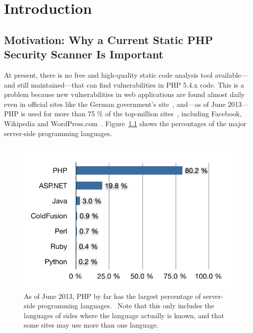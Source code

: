 \chapter{Introduction}

\section{Motivation: Why a Current Static PHP Security Scanner Is Important}
At present, there is no free and high-quality static code analysis tool available---and still maintained---that can find vulnerabilities in PHP 5.4.x code. This is a problem because new vulnerabilities in web applications are found almost daily~\cite{osvdb} even in official sites like the German government's site~\cite{xss-bundesregierung}, and---as of June 2013---PHP is used for more than 75 \% of the top-million sites~\cite{w3techs-php-usage}, including Facebook, Wikipedia and WordPress.com~\cite{w3techs-php-sites}. Figure~\ref{fig:php-percentage} shows the percentages of the major server-side programming languages.

\begin{figure}[htb]
  \begin{center}
    \includegraphics[scale=1.0]{images/language-percentage}
    \caption{As of June 2013, PHP by far has the largest percentage of server-side programming languages.~\cite{w3techs-php-usage} Note that this only includes the languages of sides where the language actually is known, and that some sites may use more than one language.}
    \label{fig:php-percentage}
  \end{center}
\end{figure}


